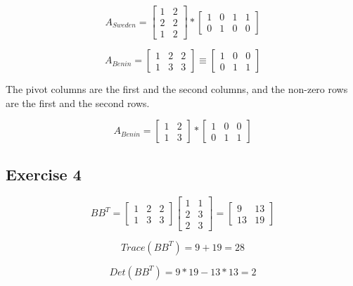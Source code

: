 \documentclass{article}
\begin{document}
\[A_{Sweden} =
    \begin{bmatrix}
        1 & 2 \\
        2 & 2 \\
        1 & 2
    \end{bmatrix}
    *
    \begin{bmatrix}
        1 & 0 & 1 & 1 \\
        0 & 1 & 0 & 0
    \end{bmatrix}
\]

\[A_{Benin} =
    \begin{bmatrix}
        1 & 2 & 2 \\
        1 & 3 & 3
    \end{bmatrix}
    \equiv
    \begin{bmatrix}
        1 & 0 & 0 \\
        0 & 1 & 1
    \end{bmatrix}
\]

The pivot columns are the first and the second columns, and the non-zero rows are the first and the second rows.

\[A_{Benin} =
    \begin{bmatrix}
        1 & 2 \\
        1 & 3
    \end{bmatrix}
    *
    \begin{bmatrix}
        1 & 0 & 0 \\
        0 & 1 & 1
    \end{bmatrix}
\]

\subsection{Exercise 4}
\[
    BB^{T} =
    \begin{bmatrix}
        1 & 2 & 2 \\
        1 & 3 & 3
    \end{bmatrix}
    \begin{bmatrix}
        1 & 1 \\
        2 & 3 \\
        2 & 3
    \end{bmatrix}
    = \begin{bmatrix}
        9  & 13 \\
        13 & 19
    \end{bmatrix}
\]

\[
    Trace(BB^{T}) = 9 + 19 = 28
\]

\[
    Det(BB^{T}) = 9 * 19 - 13 * 13 = 2
\]
\end{document}
